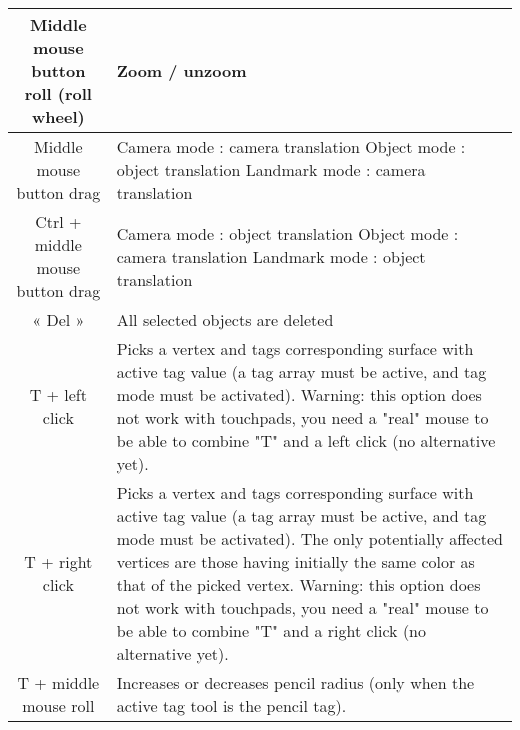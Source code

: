 \begin{tabularx}{\linewidth}{ | c | X | }
Middle mouse button roll (roll wheel) & Zoom / unzoom \\ \hline		
	
Middle mouse button drag 
& Camera mode : camera translation\newline
 Object mode : object translation\newline
 Landmark mode : camera translation \\ \hline	
		
Ctrl + middle mouse button drag 
& Camera mode : object translation\newline
Object mode : camera translation\newline
Landmark mode : object translation \\ \hline			

« Del » & All selected objects are deleted \\ \hline			

T + left click & Picks a vertex and tags corresponding surface with active tag value (a tag array must be active, and tag mode must be activated). Warning: this option does not work with touchpads, you need a "real" mouse to be able to combine "T" and a left click (no alternative yet).  \\ \hline			
 
T + right click & Picks a vertex and tags corresponding surface with active tag value (a tag array must be active, and tag mode must be activated). The only potentially affected vertices are those having initially the same color as that of the picked vertex. Warning: this option does not work with touchpads, you need a "real" mouse to be able to combine "T" and a right click (no alternative yet).  \\ \hline			

T + middle mouse roll & Increases or decreases pencil radius (only when the active tag tool is the pencil tag).  \\ \hline			

 \end{tabularx}

